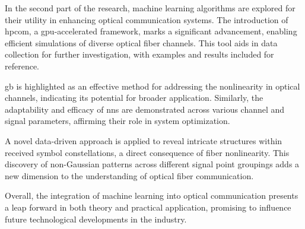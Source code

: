 
In the second part of the research, machine learning algorithms are explored for their utility in enhancing optical communication systems. The introduction of \acrfull{hpcom}, a \acrshort{gpu}-accelerated framework, marks a significant advancement, enabling efficient simulations of diverse optical fiber channels. This tool aids in data collection for further investigation, with examples and results included for reference.

\acrfull{gb} is highlighted as an effective method for addressing the nonlinearity in optical channels, indicating its potential for broader application. Similarly, the adaptability and efficacy of \acrshort{nn}s are demonstrated across various channel and signal parameters, affirming their role in system optimization.

A novel data-driven approach is applied to reveal intricate structures within received symbol constellations, a direct consequence of fiber nonlinearity. This discovery of non-Gaussian patterns across different signal point groupings adds a new dimension to the understanding of optical fiber communication.

Overall, the integration of machine learning into optical communication presents a leap forward in both theory and practical application, promising to influence future technological developments in the industry.

